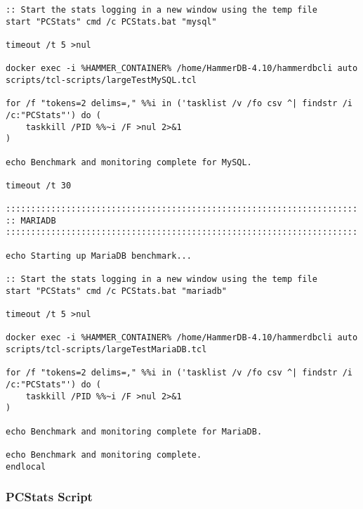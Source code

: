 \begin{lstlisting}[caption={Batch script to run the TCL scripts}, label={lst:batch-script}]
:: Start the stats logging in a new window using the temp file
start "PCStats" cmd /c PCStats.bat "mysql"

timeout /t 5 >nul

docker exec -i %HAMMER_CONTAINER% /home/HammerDB-4.10/hammerdbcli auto scripts/tcl-scripts/largeTestMySQL.tcl

for /f "tokens=2 delims=," %%i in ('tasklist /v /fo csv ^| findstr /i /c:"PCStats"') do (
    taskkill /PID %%~i /F >nul 2>&1
)

echo Benchmark and monitoring complete for MySQL.

timeout /t 30

::::::::::::::::::::::::::::::::::::::::::::::::::::::::::::::::::::::
:: MARIADB
::::::::::::::::::::::::::::::::::::::::::::::::::::::::::::::::::::::

echo Starting up MariaDB benchmark...

:: Start the stats logging in a new window using the temp file
start "PCStats" cmd /c PCStats.bat "mariadb"

timeout /t 5 >nul

docker exec -i %HAMMER_CONTAINER% /home/HammerDB-4.10/hammerdbcli auto scripts/tcl-scripts/largeTestMariaDB.tcl

for /f "tokens=2 delims=," %%i in ('tasklist /v /fo csv ^| findstr /i /c:"PCStats"') do (
    taskkill /PID %%~i /F >nul 2>&1
)

echo Benchmark and monitoring complete for MariaDB.

echo Benchmark and monitoring complete.
endlocal
\end{lstlisting}

\subsubsection{PCStats Script}
\label{sec:pcstats-script}

